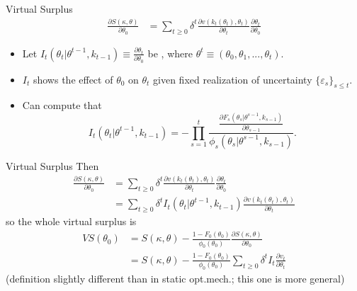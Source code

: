 \documentclass[english,10pt
,aspectratio=169
]{beamer}
\begin{document}
\begin{frame}{Virtual Surplus}
\begin{align*}
	\frac{\partial S(\kappa,\theta)}{\partial \theta_0} &= \sum_{t\geq 0} \delta^t \frac{\partial v(k_t(\theta_t),\theta_t)}{\partial \theta_t} \frac{\partial \theta_t}{\partial \theta_0}
\end{align*}
\begin{itemize}
	\item Let $I_t(\theta_t | \theta^{t-1}, k_{t-1}) \equiv \frac{\partial \theta_t}{\partial \theta_0}$ be , where $\theta^t \equiv (\theta_0, \theta_1,...,\theta_t)$.
	\item $I_t$ shows the effect of $\theta_0$ on $\theta_t$ given fixed realization of uncertainty $\{\varepsilon_s\}_{s\leq t}$.
	\item Can compute that $$I_t(\theta_t | \theta^{t-1}, k_{t-1}) = -\prod_{s=1}^t \frac{\frac{\partial F_s(\theta_s | \theta^{s-1}, k_{s-1})}{\partial \theta_{s-1}}}{\phi_s(\theta_s | \theta^{s-1}, k_{s-1})}.$$
\end{itemize}
\end{frame}


\begin{frame}{Virtual Surplus}
Then
\begin{align*}
	\frac{\partial S(\kappa,\theta)}{\partial \theta_0} &= \sum_{t\geq 0} \delta^t \frac{\partial v(k_t(\theta_t),\theta_t)}{\partial \theta_t} \frac{\partial \theta_t}{\partial \theta_0}
	\\
	&= \sum_{t\geq 0} \delta^t I_t(\theta_t | \theta^{t-1}, k_{t-1}) \frac{\partial v(k_t(\theta_t),\theta_t)}{\partial \theta_t}
\end{align*}
so the whole virtual surplus is
\begin{align*}
	VS(\theta_0) &= S(\kappa,\theta) - \frac{1-F_0(\theta_0)}{\phi_0(\theta_0)} \frac{\partial S(\kappa,\theta)}{\partial \theta_0}
	\\
	&= S(\kappa,\theta) - \frac{1-F_0(\theta_0)}{\phi_0(\theta_0)} \sum_{t\geq 0} \delta^t I_t \frac{\partial v_t}{\partial \theta_t}
\end{align*}
(definition slightly different than in static opt.mech.; this one is more general)
\end{frame}
\end{document}
